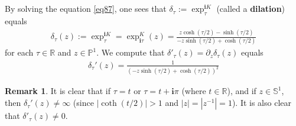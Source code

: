 \documentclass[12pt,b5paper,notitlepage]{article}
\theoremstyle{definition}
\newtheorem{rem}[df]{Remark}
\theoremstyle{plain}
\newcommand{\im}{\mathbf{i}}
\newcommand{\Pbb}{\mathbb P}
\newcommand{\Rbb}{\mathbb R}
\newcommand{\Sbb}{{\mathbb S}}
\numberwithin{equation}{section}
\begin{document}
\subsection{}



By solving the equation \eqref{eq87}, one sees that $\delta_\tau:=\exp^{\im K}_\tau$ (called a \textbf{dilation}) equals 
\begin{align}\label{eqb21}
\delta_\tau(z):=\exp^{\im K}_\tau=\exp^K_{\im\tau}(z)=\frac{z\cosh(\tau/2)-\sinh(\tau/2)}{-z\sinh(\tau/2)+\cosh(\tau/2)}
\end{align}
for each $\tau\in\Rbb$ and $z\in\Pbb^1$. We compute that $\delta'_\tau(z)=\partial_z\delta_\tau(z)$ equals
\begin{align}\label{eqb25}
\delta_\tau'(z)=\frac 1{(-z\sinh(\tau/2)+\cosh(\tau/2))^2}
\end{align}

\begin{rem}
It is clear that if  $\tau=t$ or $\tau=t+\im\pi$ (where $t\in\Rbb$), and if $z\in\Sbb^1$, then $\delta_\tau'(z)\neq \infty$ (since $|\coth(t/2)|>1$ and $|z|=|z^{-1}|=1$). It is also clear that $\delta'_\tau(z)\neq0$.
\end{rem}
\end{document}

